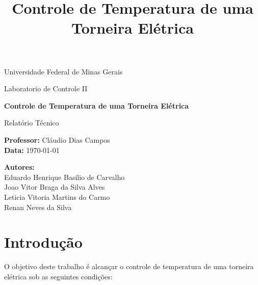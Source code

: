 \documentclass[conference,harvard,brazil,english]{sbatex}
\begin{document}

\title{Controle de Temperatura de uma Torneira Elétrica}

\begin{titlepage}
    \centering

    {\Large Universidade Federal de Minas Gerais\par}
    \vspace{0.5cm}
    {\large Laboratorio de Controle II\par}
    \vspace{2.2cm}

    {\LARGE\bfseries Controle de Temperatura de uma Torneira Elétrica\par}
    \vspace{1.2cm}

    {\large Relatório Técnico\par}
    \vspace{2.0cm}

    \begin{flushleft}
        \textbf{Professor:} Cláudio Dias Campos \\
        \textbf{Data:} \today
    \end{flushleft}

    \begin{flushleft}
        \textbf{Autores:} \\
        Eduardo Henrique Basilio de Carvalho \\
        Joao Vitor Braga da Silva Alves \\
        Leticia Vitoria Martins do Carmo \\
        Renan Neves da Silva
    \end{flushleft}
\end{titlepage}

\pagebreak

\pagestyle{fancy}
\fancyhf{}
\fancyhead[R]{\thepage}
\renewcommand{\headrulewidth}{0pt}
\setlength{\headheight}{14pt}
\setlength{\footskip}{10pt}

\tableofcontents

\listoffigures

\pagebreak

\section{Introdução}\label{sec:introducao}

O objetivo deste trabalho é alcançar o controle de temperatura de uma torneira elétrica sob as seguintes condições:
\end{document}
